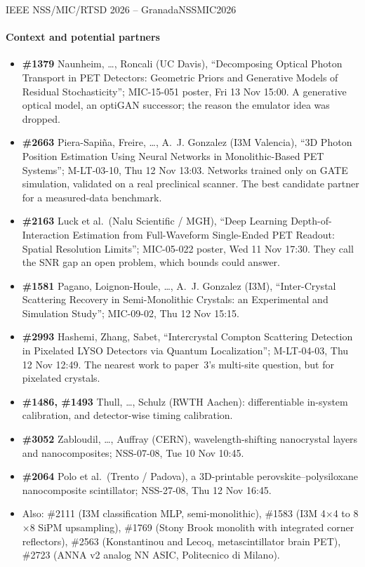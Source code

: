 \begin{confnote}{IEEE NSS/MIC/RTSD 2026 -- Granada}{NSSMIC2026}
\paragraph{Context and potential partners}
\begin{itemize}
	\item \textbf{\#1379} Naunheim, \ldots, Roncali (UC Davis), ``Decomposing Optical Photon Transport in PET Detectors: Geometric Priors and Generative Models of Residual Stochasticity''; MIC-15-051 poster, Fri 13 Nov 15:00.
		A generative optical model, an optiGAN successor; the reason the emulator idea was dropped.
	\item \textbf{\#2663} Piera-Sapiña, Freire, \ldots, A.~J. Gonzalez (I3M Valencia), ``3D Photon Position Estimation Using Neural Networks in Monolithic-Based PET Systems''; M-LT-03-10, Thu 12 Nov 13:03.
		Networks trained only on GATE simulation, validated on a real preclinical scanner.
		The best candidate partner for a measured-data benchmark.
	\item \textbf{\#2163} Luck et al.\ (Nalu Scientific / MGH), ``Deep Learning Depth-of-Interaction Estimation from Full-Waveform Single-Ended PET Readout: Spatial Resolution Limits''; MIC-05-022 poster, Wed 11 Nov 17:30.
		They call the SNR gap an open problem, which bounds could answer.
	\item \textbf{\#1581} Pagano, Loignon-Houle, \ldots, A.~J. Gonzalez (I3M), ``Inter-Crystal Scattering Recovery in Semi-Monolithic Crystals: an Experimental and Simulation Study''; MIC-09-02, Thu 12 Nov 15:15.
	\item \textbf{\#2993} Hashemi, Zhang, Sabet, ``Intercrystal Compton Scattering Detection in Pixelated LYSO Detectors via Quantum Localization''; M-LT-04-03, Thu 12 Nov 12:49.
		The nearest work to paper~3's multi-site question, but for pixelated crystals.
	\item \textbf{\#1486, \#1493} Thull, \ldots, Schulz (RWTH Aachen): differentiable in-system calibration, and detector-wise timing calibration.
	\item \textbf{\#3052} Zabloudil, \ldots, Auffray (CERN), wavelength-shifting nanocrystal layers and nanocomposites; NSS-07-08, Tue 10 Nov 10:45.
	\item \textbf{\#2064} Polo et al.\ (Trento / Padova), a 3D-printable perovskite--polysiloxane nanocomposite scintillator; NSS-27-08, Thu 12 Nov 16:45.
	\item Also: \#2111 (I3M classification MLP, semi-monolithic), \#1583 (I3M 4$\times$4 to 8$\times$8 SiPM upsampling), \#1769 (Stony Brook monolith with integrated corner reflectors), \#2563 (Konstantinou and Lecoq, metascintillator brain PET), \#2723 (ANNA v2 analog NN ASIC, Politecnico di Milano).
\end{itemize}


\end{confnote}

